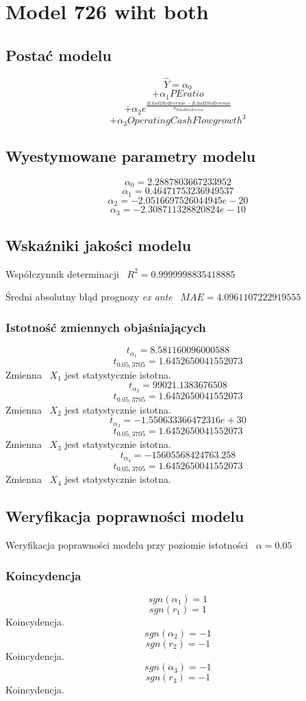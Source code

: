 \section{Model 726 wiht both}
\subsection{Postać modelu}
\[ \hat{Y} = \alpha_0\]
\[+\alpha_{1}PE ratio\]
\[+\alpha_{2}e^{\frac{RAndD to Revenue - \overline{RAndD to Revenue}}{\sigma_{RAndD to Revenue}}}\]
\[+\alpha_{3}Operating Cash Flow growth^3\]
\subsection{Wyestymowane parametry modelu}
\[\alpha_{0} = 2.2887803667233952\]
\[\alpha_{1} = 0.46471753236949537\]
\[\alpha_{2} = -2.0516697526044945e-20\]
\[\alpha_{3} = -2.308711328820824e-10\]
\subsection{Wskaźniki jakości modelu}
Współczynnik determinacji ~$R^2 = 0.9999998835418885$

Średni absolutny błąd prognozy \textit{ex ante} ~$MAE = 4.0961107222919555$
\subsubsection{Istotność zmiennych objaśniających}
\[t_{\alpha_{1}} = 8.581160096000588\]
\[t_{0.05, 3705} = 1.6452650041552073\]
Zmienna ~$X_{1}$ jest statystycznie istotna.
\[t_{\alpha_{2}} = 99021.1383676508\]
\[t_{0.05, 3705} = 1.6452650041552073\]
Zmienna ~$X_{2}$ jest statystycznie istotna.
\[t_{\alpha_{3}} = -1.550633366472316e+30\]
\[t_{0.05, 3705} = 1.6452650041552073\]
Zmienna ~$X_{3}$ jest statystycznie istotna.
\[t_{\alpha_{4}} = -15605568424763.258\]
\[t_{0.05, 3705} = 1.6452650041552073\]
Zmienna ~$X_{4}$ jest statystycznie istotna.
\subsection{Weryfikacja poprawności modelu}
Weryfikacja poprawności modelu przy poziomie istotności ~$\alpha = 0.05$
\subsubsection{Koincydencja}
\[sgn(\alpha_{1}) = 1\]
\[sgn(r_{1}) = 1\]
Koincydencja.
\[sgn(\alpha_{2}) = -1\]
\[sgn(r_{2}) = -1\]
Koincydencja.
\[sgn(\alpha_{3}) = -1\]
\[sgn(r_{3}) = -1\]
Koincydencja.
